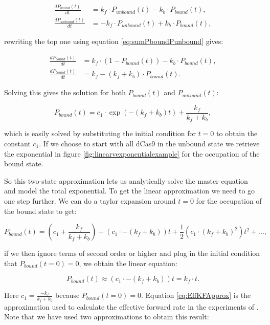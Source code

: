 \begin{align}
\frac{dP_{bound}(t)}{dt} &= k_f \cdot P_{unbound}(t) - k_b \cdot P_{bound}(t), \\
\frac{dP_{unbound}(t)}{dt} &= - k_f \cdot P_{unbound}(t) + k_b \cdot P_{bound}(t),
\end{align}

rewriting the top one using equation \ref{eq:sumPboundPunbound} gives:

\begin{align}
\frac{dP_{bound}(t)}{dt} &= k_f \cdot (1-P_{bound}(t)) - k_b \cdot P_{bound}(t), \\
\frac{dP_{bound}(t)}{dt} &= k_f - (k_f + k_b) \cdot P_{bound}(t).
\end{align}

Solving this gives the solution for both $P_{bound}(t)$ and $P_{unbound}(t)$:

\begin{equation}
P_{bound}(t) = c_1 \cdot \exp(-(k_f + k_b)t) + \frac{k_f}{k_f+k_b},
\end{equation}

which is easily solved by substituting the initial condition for $t=0$ to obtain the constant $c_1$. If we choose to start with all dCas9 in the unbound state we retrieve the exponential in figure \ref{fig:linearvexponentialexample} for the occupation of the bound state.

So this two-state approximation lets us analytically solve the master equation and model the total exponential. To get the linear approximation we need to go one step further. We can do a taylor expansion around $t=0$ for the occupation of the bound state to get:

\begin{equation}
P_{bound}(t) = (c_1 + \frac{k_f}{k_f+k_b}) + (c_1 \cdot -(k_f + k_b))t + \frac{1}{2}(c_1 \cdot (k_f + k_b)^2)t^2 + ...,
\label{eq:TaylorExpPB}
\end{equation}

if we then ignore terms of second order or higher and plug in the initial condition that $P_{bound}(t=0) = 0$, we obtain the linear equation:

\begin{equation}
P_{bound}(t) \approx (c_1 \cdot -(k_f + k_b))t = k_f \cdot t.
\label{eq:EffKFApprox}
\end{equation}

Here $c_1 = \frac{-k_f}{k_f+k_b}$ because $P_{bound}(t=0) = 0$. Equation \ref{eq:EffKFApprox} is the approximation used to calculate the effective forward rate in the experiments of \cite{PNAS}. Note that we have used two approximations to obtain this result:

